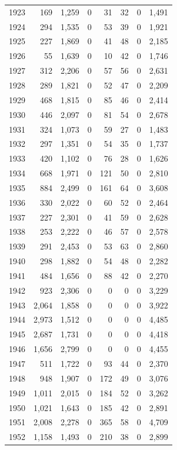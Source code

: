 \documentclass[
  english,
]{article}
\begin{document}
\begin{longtable}[t]{lrrrrrrr}
1923 & 169 & 1,259 & 0 & 31 & 32 & 0 & 1,491\\
1924 & 294 & 1,535 & 0 & 53 & 39 & 0 & 1,921\\
1925 & 227 & 1,869 & 0 & 41 & 48 & 0 & 2,185\\
1926 & 55 & 1,639 & 0 & 10 & 42 & 0 & 1,746\\
1927 & 312 & 2,206 & 0 & 57 & 56 & 0 & 2,631\\
1928 & 289 & 1,821 & 0 & 52 & 47 & 0 & 2,209\\
1929 & 468 & 1,815 & 0 & 85 & 46 & 0 & 2,414\\
1930 & 446 & 2,097 & 0 & 81 & 54 & 0 & 2,678\\
1931 & 324 & 1,073 & 0 & 59 & 27 & 0 & 1,483\\
1932 & 297 & 1,351 & 0 & 54 & 35 & 0 & 1,737\\
1933 & 420 & 1,102 & 0 & 76 & 28 & 0 & 1,626\\
1934 & 668 & 1,971 & 0 & 121 & 50 & 0 & 2,810\\
1935 & 884 & 2,499 & 0 & 161 & 64 & 0 & 3,608\\
1936 & 330 & 2,022 & 0 & 60 & 52 & 0 & 2,464\\
1937 & 227 & 2,301 & 0 & 41 & 59 & 0 & 2,628\\
1938 & 253 & 2,222 & 0 & 46 & 57 & 0 & 2,578\\
1939 & 291 & 2,453 & 0 & 53 & 63 & 0 & 2,860\\
1940 & 298 & 1,882 & 0 & 54 & 48 & 0 & 2,282\\
1941 & 484 & 1,656 & 0 & 88 & 42 & 0 & 2,270\\
1942 & 923 & 2,306 & 0 & 0 & 0 & 0 & 3,229\\
1943 & 2,064 & 1,858 & 0 & 0 & 0 & 0 & 3,922\\
1944 & 2,973 & 1,512 & 0 & 0 & 0 & 0 & 4,485\\
1945 & 2,687 & 1,731 & 0 & 0 & 0 & 0 & 4,418\\
1946 & 1,656 & 2,799 & 0 & 0 & 0 & 0 & 4,455\\
1947 & 511 & 1,722 & 0 & 93 & 44 & 0 & 2,370\\
1948 & 948 & 1,907 & 0 & 172 & 49 & 0 & 3,076\\
1949 & 1,011 & 2,015 & 0 & 184 & 52 & 0 & 3,262\\
1950 & 1,021 & 1,643 & 0 & 185 & 42 & 0 & 2,891\\
1951 & 2,008 & 2,278 & 0 & 365 & 58 & 0 & 4,709\\
1952 & 1,158 & 1,493 & 0 & 210 & 38 & 0 & 2,899\\

\end{longtable}
\end{document}
